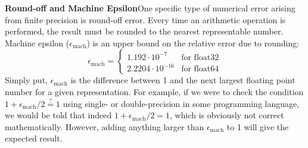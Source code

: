 \textbf{Round-off and Machine Epsilon}\quad One specific type of numerical error arising from finite precision is round-off error. Every time an arithmetic operation is performed, the result must be rounded to the nearest representable number. Machine epsilon ($\epsilon_{\text{mach}}$) is an upper bound on the relative error due to rounding:
\begin{equation*}
    \epsilon_{\text{mach}} =
    \begin{cases}
        1.192\cdot 10^{-7} & \text{for float32} \\
        2.2204\cdot 10^{-16} & \text{for float64}
    \end{cases}
\end{equation*}
Simply put, $\epsilon_{\text{mach}}$ is the difference between 1 and the next largest floating point number for a given representation. For example, if we were to check the condition $1 + \epsilon_{\text{mach}}/2 \stackrel{?}{=} 1$ using single- or double-precision in some programming language, we would be told that indeed $1 + \epsilon_{\text{mach}}/2 = 1$, which is obviously not correct mathematically. However, adding anything larger than $\epsilon_{\text{mach}}$ to 1 will give the expected result.


